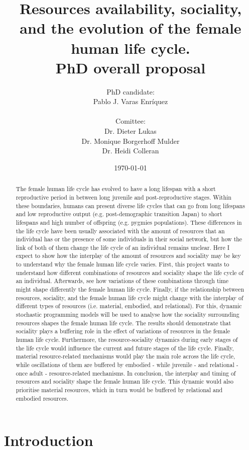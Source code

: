 \documentclass{article}
\title{
Resources availability, sociality, and the evolution of the female human life cycle.\\
PhD overall proposal}
\author{PhD candidate:\\
Pablo J. Varas Enríquez\\\\
Comittee:\\
Dr. Dieter Lukas\\
Dr. Monique Borgerhoff Mulder\\
Dr. Heidi Colleran}
\date{\today}
\begin{document}
\maketitle

\tableofcontents

\begin{abstract}
    The female human life cycle has evolved to have a long lifespan with a short reproductive period in between long juvenile and post-reproductive stages. Within these boundaries, humans can present diverse life cycles that can go from long lifespans and low reproductive output (e.g. post-demographic transition Japan) to short lifespans and high number of offspring (e.g. pygmies populations). These differences in the life cycle have been usually associated with the amount of resources that an individual has or the presence of some individuals in their social network, but how the link of both of them change the life cycle of an individual remains unclear. Here I expect to show how the interplay of the amount of resources and sociality may be key to understand why the female human life cycle varies. First, this project wants to understand how different combinations of resources and sociality shape the life cycle of an individual. Afterwards, see how variations of these combinations through time might shape differently the female human life cycle. Finally, if the relationship between resources, sociality, and the female human life cycle might change with the interplay of different types of resources (i.e. material, embodied, and relational). For this, dynamic stochastic programming models will be used to analyse how the sociality surrounding resources shapes the female human life cycle. The results should demonstrate that sociality plays a buffering role in the effect of variations of resources in the female human life cycle. Furthermore, the resource-sociality dynamics during early stages of the life cycle would influence the current and future stages of the life cycle. Finally, material resource-related mechanisms would play the main role across the life cycle, while oscillations of them are buffered by embodied - while juvenile - and relational - once adult - resource-related mechanisms. In conclusion, the interplay and timing of resources and sociality shape the female human life cycle. This dynamic would also prioritise material resources, which in turn would be buffered by relational and embodied resources.
\end{abstract}

\section{Introduction}
\end{document}
